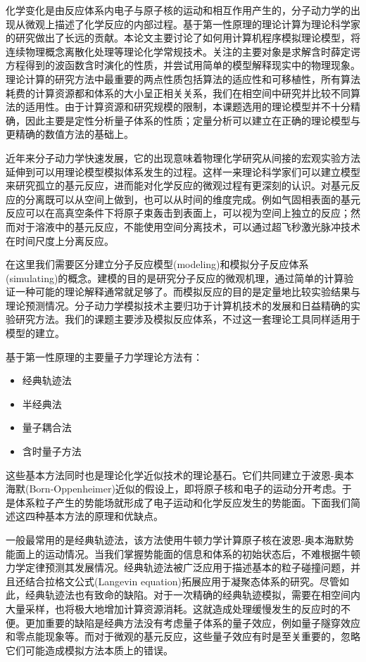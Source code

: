 
化学变化是由反应体系内电子与原子核的运动和相互作用产生的，分子动力学的出现从微观上描述了化学反应的内部过程。基于第一性原理的理论计算为理论科学家的研究做出了长远的贡献。本论文主要讨论了如何用计算机程序模拟理论模型，将连续物理概念离散化处理等理论化学常规技术。关注的主要对象是求解含时薛定谔方程得到的波函数含时演化的性质，并尝试用简单的模型解释现实中的物理现象。理论计算的研究方法中最重要的两点性质包括算法的适应性和可移植性，所有算法耗费的计算资源都和体系的大小呈正相关关系，我们在相空间中研究并比较不同算法的适用性。由于计算资源和研究规模的限制，本课题选用的理论模型并不十分精确，因此主要是定性分析量子体系的性质；定量分析可以建立在正确的理论模型与更精确的数值方法的基础上。

近年来分子动力学快速发展，它的出现意味着物理化学研究从间接的宏观实验方法延伸到可以用理论模型模拟体系发生的过程。这样一来理论科学家们可以建立模型来研究孤立的基元反应，进而能对化学反应的微观过程有更深刻的认识。对基元反应的分离既可以从空间上做到，也可以从时间的维度完成。例如气固相表面的基元反应可以在高真空条件下将原子束轰击到表面上，可以视为空间上独立的反应；然而对于溶液中的基元反应，不能使用空间分离技术，可以通过超飞秒激光脉冲技术在时间尺度上分离反应。

在这里我们需要区分建立分子反应模型(modeling)和模拟分子反应体系(simulating)的概念。建模的目的是研究分子反应的微观机理，通过简单的计算验证一种可能的理论解释通常就足够了。而模拟反应的目的是定量地比较实验结果与理论预测情况。分子动力学模拟技术主要归功于计算机技术的发展和日益精确的实验研究方法。我们的课题主要涉及模拟反应体系，不过这一套理论工具同样适用于模型的建立。

基于第一性原理的主要量子力学理论方法有：
\begin{multicols}{2}
\begin{itemize}
  \item 经典轨迹法
  \item 半经典法
  \item 量子耦合法
  \item 含时量子方法
\end{itemize}
\end{multicols}
这些基本方法同时也是理论化学近似技术的理论基石。它们共同建立于波恩-奥本海默(Born-Oppenheimer)近似的假设上，即将原子核和电子的运动分开考虑。于是体系粒子产生的势能场就形成了电子运动和化学反应发生的势能面。下面我们简述这四种基本方法的原理和优缺点。

一般最常用的是经典轨迹法，该方法使用牛顿力学计算原子核在波恩-奥本海默势能面上的运动情况。当我们掌握势能面的信息和体系的初始状态后，不难根据牛顿力学定律预测其发展情况。经典轨迹法被广泛应用于描述基本的粒子碰撞问题，并且还结合拉格文公式(Langevin equation)拓展应用于凝聚态体系的研究。尽管如此，经典轨迹法也有致命的缺陷。对于一次精确的经典轨迹模拟，需要在相空间内大量采样，也将极大地增加计算资源消耗。这就造成处理缓慢发生的反应时的不便。更加重要的缺陷是经典方法没有考虑量子体系的量子效应，例如量子隧穿效应和零点能现象等。而对于微观的基元反应，这些量子效应有时是至关重要的，忽略它们可能造成模拟方法本质上的错误。

